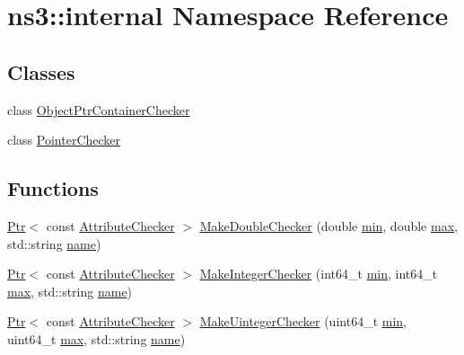 \hypertarget{namespacens3_1_1internal}{}\section{ns3\+:\+:internal Namespace Reference}
\label{namespacens3_1_1internal}
\subsection*{Classes}
\begin{DoxyCompactItemize}
\item 
class \hyperlink{classns3_1_1internal_1_1ObjectPtrContainerChecker}{Object\+Ptr\+Container\+Checker}
\item 
class \hyperlink{classns3_1_1internal_1_1PointerChecker}{Pointer\+Checker}
\end{DoxyCompactItemize}
\subsection*{Functions}
\begin{DoxyCompactItemize}
\item 
\hyperlink{classns3_1_1Ptr}{Ptr}$<$ const \hyperlink{classns3_1_1AttributeChecker}{Attribute\+Checker} $>$ \hyperlink{namespacens3_1_1internal_ace03ae9f889a7a79d87e3a4352a37099}{Make\+Double\+Checker} (double \hyperlink{80211b_8c_ac6afabdc09a49a433ee19d8a9486056d}{min}, double \hyperlink{80211b_8c_affe776513b24d84b39af8ab0930fef7f}{max}, std\+::string \hyperlink{generate__test__data__lte__spectrum__model_8m_ab74e6bf80237ddc4109968cedc58c151}{name})
\item 
\hyperlink{classns3_1_1Ptr}{Ptr}$<$ const \hyperlink{classns3_1_1AttributeChecker}{Attribute\+Checker} $>$ \hyperlink{namespacens3_1_1internal_ad16c6dd4fd0319992767b9ac2a17b19b}{Make\+Integer\+Checker} (int64\+\_\+t \hyperlink{80211b_8c_ac6afabdc09a49a433ee19d8a9486056d}{min}, int64\+\_\+t \hyperlink{80211b_8c_affe776513b24d84b39af8ab0930fef7f}{max}, std\+::string \hyperlink{generate__test__data__lte__spectrum__model_8m_ab74e6bf80237ddc4109968cedc58c151}{name})
\item 
\hyperlink{classns3_1_1Ptr}{Ptr}$<$ const \hyperlink{classns3_1_1AttributeChecker}{Attribute\+Checker} $>$ \hyperlink{namespacens3_1_1internal_a4b15bd1dbc7f165db34704f333c6b005}{Make\+Uinteger\+Checker} (uint64\+\_\+t \hyperlink{80211b_8c_ac6afabdc09a49a433ee19d8a9486056d}{min}, uint64\+\_\+t \hyperlink{80211b_8c_affe776513b24d84b39af8ab0930fef7f}{max}, std\+::string \hyperlink{generate__test__data__lte__spectrum__model_8m_ab74e6bf80237ddc4109968cedc58c151}{name})
\end{DoxyCompactItemize}


